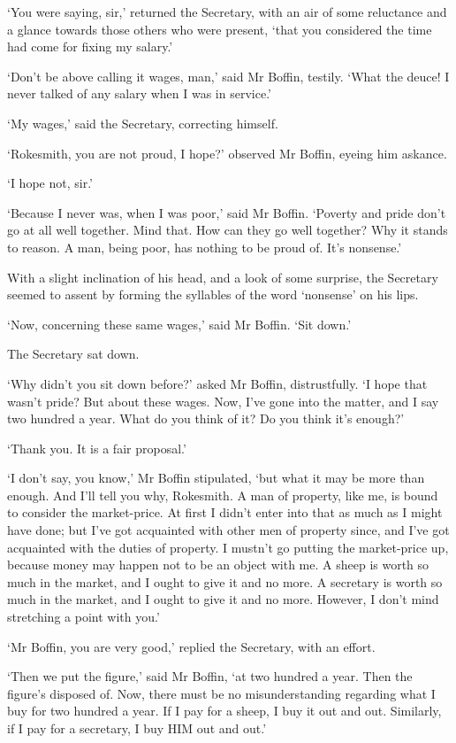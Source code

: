 ‘You were saying, sir,’ returned the Secretary, with an air of some
reluctance and a glance towards those others who were present, ‘that you
considered the time had come for fixing my salary.’

‘Don’t be above calling it wages, man,’ said Mr Boffin, testily. ‘What
the deuce! I never talked of any salary when I was in service.’

‘My wages,’ said the Secretary, correcting himself.

‘Rokesmith, you are not proud, I hope?’ observed Mr Boffin, eyeing him
askance.

‘I hope not, sir.’

‘Because I never was, when I was poor,’ said Mr Boffin. ‘Poverty and
pride don’t go at all well together. Mind that. How can they go well
together? Why it stands to reason. A man, being poor, has nothing to be
proud of. It’s nonsense.’

With a slight inclination of his head, and a look of some surprise,
the Secretary seemed to assent by forming the syllables of the word
‘nonsense’ on his lips.

‘Now, concerning these same wages,’ said Mr Boffin. ‘Sit down.’

The Secretary sat down.

‘Why didn’t you sit down before?’ asked Mr Boffin, distrustfully. ‘I
hope that wasn’t pride? But about these wages. Now, I’ve gone into the
matter, and I say two hundred a year. What do you think of it? Do you
think it’s enough?’

‘Thank you. It is a fair proposal.’

‘I don’t say, you know,’ Mr Boffin stipulated, ‘but what it may be more
than enough. And I’ll tell you why, Rokesmith. A man of property, like
me, is bound to consider the market-price. At first I didn’t enter into
that as much as I might have done; but I’ve got acquainted with other
men of property since, and I’ve got acquainted with the duties of
property. I mustn’t go putting the market-price up, because money may
happen not to be an object with me. A sheep is worth so much in the
market, and I ought to give it and no more. A secretary is worth so much
in the market, and I ought to give it and no more. However, I don’t mind
stretching a point with you.’

‘Mr Boffin, you are very good,’ replied the Secretary, with an effort.

‘Then we put the figure,’ said Mr Boffin, ‘at two hundred a year.
Then the figure’s disposed of. Now, there must be no misunderstanding
regarding what I buy for two hundred a year. If I pay for a sheep, I buy
it out and out. Similarly, if I pay for a secretary, I buy HIM out and
out.’

